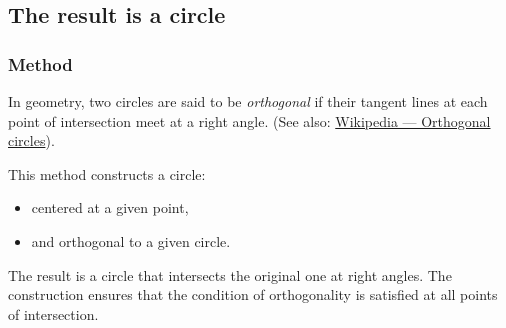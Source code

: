 







\subsection{The result is a circle} %

\subsubsection{Method } %
\label{ssub:method_circle_orthogonal_from_pt}

In geometry, two circles are said to be \emph{orthogonal} if their tangent lines at each point of intersection meet at a right angle.  
(See also: \href{https://en.wikipedia.org/wiki/Orthogonal_circles}{Wikipedia — Orthogonal circles}).

\medskip
\noindent
This method constructs a circle:
\begin{itemize}
  \item centered at a given point,
  \item and orthogonal to a given circle.
\end{itemize}

\noindent
The result is a circle that intersects the original one at right angles. The construction ensures that the condition of orthogonality is satisfied at all points of intersection.

\vspace{1em}

